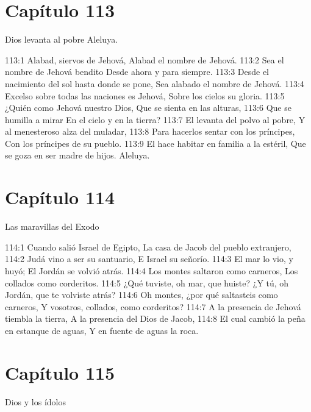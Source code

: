 \section*{Capítulo 113}
Dios levanta al pobre 
Aleluya. 
 
113:1 Alabad, siervos de Jehová, 
Alabad el nombre de Jehová. 
113:2 Sea el nombre de Jehová bendito 
Desde ahora y para siempre. 
113:3 Desde el nacimiento del sol hasta donde se pone, 
Sea alabado el nombre de Jehová. 
113:4 Excelso sobre todas las naciones es Jehová, 
Sobre los cielos su gloria. 
113:5 ¿Quién como Jehová nuestro Dios, 
Que se sienta en las alturas, 
113:6 Que se humilla a mirar 
En el cielo y en la tierra? 
113:7 El levanta del polvo al pobre, 
Y al menesteroso alza del muladar, 
113:8 Para hacerlos sentar con los príncipes, 
Con los príncipes de su pueblo. 
113:9 El hace habitar en familia a la estéril, 
Que se goza en ser madre de hijos. 
Aleluya. 
\section*{Capítulo 114}
Las maravillas del Exodo 
 
114:1 Cuando salió Israel de Egipto, 
La casa de Jacob del pueblo extranjero, 
114:2 Judá vino a ser su santuario, 
E Israel su señorío. 
114:3 El mar lo vio, y huyó; 
El Jordán se volvió atrás. 
114:4 Los montes saltaron como carneros, 
Los collados como corderitos. 
114:5 ¿Qué tuviste, oh mar, que huiste? 
¿Y tú, oh Jordán, que te volviste atrás? 
114:6 Oh montes, ¿por qué saltasteis como carneros, 
Y vosotros, collados, como corderitos? 
114:7 A la presencia de Jehová tiembla la tierra, 
A la presencia del Dios de Jacob, 
114:8 El cual cambió la peña en estanque de aguas, 
Y en fuente de aguas la roca. 
\section*{Capítulo 115}
Dios y los ídolos 
 
